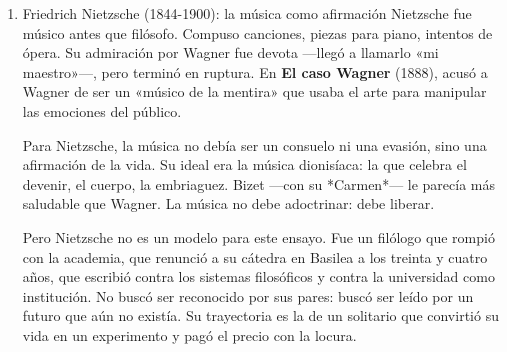 \documentclass[14pt, a4paper]{article}
\begin{document}
\begin{enumerate}
\begin{verbatim}
// Apagar la fundamental para escuchar solo armónicos
x.set(\arm_1, 0);

// Volver a encenderla
x.set(\arm_1, 1);

// Activar impares para aproximar onda cuadrada
x.set(\arm_7, 1);
x.set(\arm_9, 1);
x.set(\arm_11, 1);

// Liberar
x.free;
\end{verbatim}


\begin{itemize}
\item \textbf{\textbf{Urbain Le Verrier (1811-1877):}} Descubrió Neptuno en 1846 sin
mirar al cielo. Calculó su posición a partir de las perturbaciones
en la órbita de Urano. La astronomía ya no necesitaba telescopios:
necesitaba matemáticas. El cosmos se había convertido en un sistema
de ecuaciones.
\end{itemize}
\item Friedrich Nietzsche (1844-1900): la música como afirmación
\label{nietzsche-romanticismo}
Nietzsche fue músico antes que filósofo. Compuso canciones, piezas
para piano, intentos de ópera. Su admiración por Wagner fue devota
—llegó a llamarlo «mi maestro»—, pero terminó en ruptura. En \textbf{El caso
Wagner} (1888), acusó a Wagner de ser un «músico de la mentira» que
usaba el arte para manipular las emociones del público.

Para Nietzsche, la música no debía ser un consuelo ni una evasión,
sino una afirmación de la vida. Su ideal era la música dionisíaca: la
que celebra el devenir, el cuerpo, la embriaguez. Bizet —con su
*Carmen*— le parecía más saludable que Wagner. La música no debe
adoctrinar: debe liberar.

Pero Nietzsche no es un modelo para este ensayo. Fue un filólogo que
rompió con la academia, que renunció a su cátedra en Basilea a los
treinta y cuatro años, que escribió contra los sistemas filosóficos y
contra la universidad como institución. No buscó ser reconocido por
sus pares: buscó ser leído por un futuro que aún no existía. Su
trayectoria es la de un solitario que convirtió su vida en un
experimento y pagó el precio con la locura.


\end{enumerate}
\end{document}
